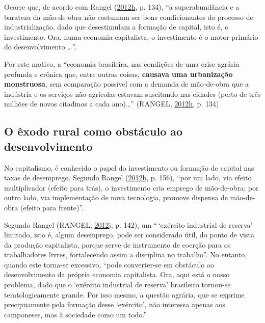 \documentclass[a4paper, 12pt]{article}
\begin{document}
Ocorre que, de acordo com Rangel
(\protect\hyperlink{ref-rangel1986b}{2012}\protect\hyperlink{ref-rangel1986b}{h},
p. 134), ``a superabundância e a barateza da mão-de-obra não costumam
ser bons condicionantes do processo de industrialização, dado que
desestimulam a formação de capital, isto é, o investimento. Ora, numa
economia capitalista, o investimento é o motor primário do
desenvolvimento \ldots{}''.

Por este motivo, a ``economia brasileira, nas condições de uma crise
agrária profunda e crônica que, entre outras coisas, \textbf{causava uma
urbanização monstruosa}, sem comparação possível com a demanda de
mão-de-obra que a indústria e os serviços não-agrícolas estavam
suscitando nas cidades (perto de três milhões de novos citadinos a cada
ano)\ldots{}'' (RANGEL,
\protect\hyperlink{ref-rangel1986b}{2012}\protect\hyperlink{ref-rangel1986b}{h},
p. 134)

\hypertarget{o-exodo-rural-como-obstaculo-ao-desenvolvimento}{%
\subsection{O êxodo rural como obstáculo ao
desenvolvimento}\label{o-exodo-rural-como-obstaculo-ao-desenvolvimento}}

No capitalismo, é conhecido o papel do investimento ou formação de
capital nas taxas de desemprego. Segundo Rangel
(\protect\hyperlink{ref-rangel1988}{2012}\protect\hyperlink{ref-rangel1988}{b},
p. 156), ``por um lado, via efeito multiplicador (efeito para trás), o
investimento cria emprego de mão-de-obra; por outro lado, via
implementação de nova tecnologia, promove dispensa de mão-de-obra
(efeito para frente)''.

Segundo Rangel (RANGEL,
\protect\hyperlink{ref-rangel1986c}{2012}\protect\hyperlink{ref-rangel1986c}{j},
p. 142), um ``\,`exército industrial de reserva' limitado, isto é, algum
desemprego, pode ser considerado útil, do ponto de vista da produção
capitalista, porque serve de instrumento de coerção para os
trabalhadores livres, fortalecendo assim a disciplina no trabalho''. No
entanto, quando este torna-se excessivo, ``pode converter-se em
obstáculo ao desenvolvimento da própria economia capitalista. Ora, aqui
está o nosso problema, dado que o `exército industrial de reserva'
brasileiro tornou-se teratologicamente grande. Por isso mesmo, a questão
agrária, que se exprime precipuamente pela formação desse `exército',
não interessa apenas aos camponeses, mas à sociedade como um todo.''
\end{document}
